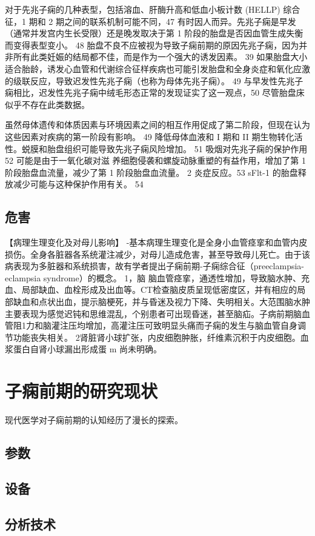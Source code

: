  对于先兆子痫的几种表型，包括溶血、肝酶升高和低血小板计数 (HELLP) 综合征，1 期和 2 期之间的联系机制可能不同，47 有时因人而异。先兆子痫是早发（通常并发宫内生长受限）还是晚发取决于第 1 阶段的胎盘是否因血管生成失衡而变得表型变小。 
 48 胎盘不良不应被视为导致子痫前期的原因先兆子痫，因为并非所有此类妊娠的结局都不佳，而是作为一个强大的诱发因素。 39 如果胎盘大小适合胎龄，诱发心血管和代谢综合征样疾病也可能引发胎盘和全身炎症和氧化应激的级联反应，导致迟发性先兆子痫（也称为母体先兆子痫）。
  49 与早发性先兆子痫相比，迟发性先兆子痫中绒毛形态正常的发现证实了这一观点，50 尽管胎盘床似乎不存在此类数据。

  虽然母体遗传和体质因素与环境因素之间的相互作用促成了第二阶段，但现在认为这些因素对疾病的第一阶段有影响。 49 降低母体血液和 I 期和 II 期生物转化活性。蜕膜和胎盘组织可能导致先兆子痫风险增加。 51 吸烟对先兆子痫的保护作用 52 可能是由于一氧化碳对滋
  养细胞侵袭和螺旋动脉重塑的有益作用，增加了第 1 阶段胎盘血流量，减少了第 1 阶段胎盘血流量。 2 炎症反应。53 sFlt-1 的胎盘释放减少可能与这种保护作用有关。 54

\subsection{危害}
【病理生理变化及对母儿影响】
-基本病理生理变化是全身小血管痉挛和血管内皮损伤。全身各脏器各系统灌注减少，对母儿造成危害，甚至导致母儿死亡。由于该病表现为多脏器和系统损害，故有学者提出子痫前期-子痫综合征（preeclampsia-eclampsia syndrome）的概念。
1，脑 脑血管痉挛，通透性增加，导致脑水肿、充血、局部缺血、血栓形成及出血等。CT检查脑皮质呈现低密度区，并有相应的局部缺血和点状出血，提示脑梗死，并与昏迷及视力下降、失明相关。大范围脑水肿主要表现为感觉迟钝和思维混乱，个别患者可出现昏迷，甚至脑疝。子病前期脑血管阻1力和脑灌注压均增加，高灌注压可致明显头痛而子痫的发生与脑血管自身调节功能丧失相关。
2肾脏肾小球扩张，内皮细胞肿胀，纤维素沉积于内皮细胞。血浆蛋白自肾小球漏出形成蛋 m
尚未明确。

\section{子痫前期的研究现状}
现代医学对子痫前期的认知经历了漫长的探索\cite{BJOG2016}。
\subsection{参数}
\subsection{设备}
\subsection{分析技术}
